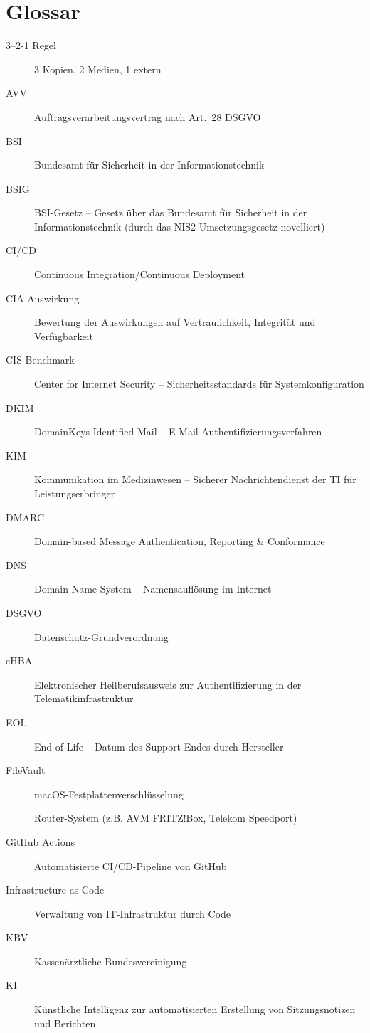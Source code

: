 \section{Glossar}

\begin{description}
  \item[3–2-1 Regel] 3 Kopien, 2 Medien, 1 extern
  \item[AVV] Auftragsverarbeitungsvertrag nach Art.~28 DSGVO
  \item[\IaCTool{}] \IaCToolLang{}
  \item[BSI] Bundesamt für Sicherheit in der Informationstechnik
  \item[BSIG] BSI-Gesetz -- Gesetz über das Bundesamt für Sicherheit in der Informationstechnik (durch das NIS2-Umsetzungsgesetz novelliert)
  \item[CI/CD] Continuous Integration/Continuous Deployment
  \item[CIA-Auswirkung] Bewertung der Auswirkungen auf Vertraulichkeit, Integrität und Verfügbarkeit
  \item[CIS Benchmark] Center for Internet Security -- Sicherheitsstandards für Systemkonfiguration
  \item[DKIM] DomainKeys Identified Mail -- E-Mail-Authentifizierungsverfahren
  \item[KIM] Kommunikation im Medizinwesen -- Sicherer Nachrichtendienst der TI für Leistungserbringer
  \item[DMARC] Domain-based Message Authentication, Reporting \& Conformance
  \item[DNS] Domain Name System -- Namensauflösung im Internet
  \item[DSGVO] Datenschutz-Grundverordnung
  \item[eHBA] Elektronischer Heilberufsausweis zur Authentifizierung in der Telematikinfrastruktur
  \item[EOL] End of Life -- Datum des Support-Endes durch Hersteller  \item[FileVault] macOS-Festplattenverschlüsselung
  \item[\RouterKurz{}] Router-System (z.B. AVM FRITZ!Box, Telekom Speedport)
  \item[GitHub Actions] Automatisierte CI/CD-Pipeline von GitHub
  \item[Infrastructure as Code] Verwaltung von IT-Infrastruktur durch Code
  \item[KBV] Kassenärztliche Bundesvereinigung
  \item[KI] Künstliche Intelligenz zur automatisierten Erstellung von Sitzungsnotizen und Berichten

\end{description}
